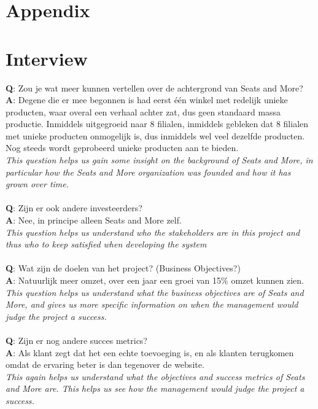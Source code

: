 \documentclass[a4paper]{article}
\begin{document}
\newpage
\section*{Appendix}
\appendix 
\section{Interview}
\textbf{Q}: Zou je wat meer kunnen vertellen over de achtergrond van Seats and More?
\textbf{A}: Degene die er mee begonnen is had eerst één winkel met redelijk unieke producten, waar overal een verhaal achter zat, dus geen standaard massa productie. Inmiddels uitgegroeid naar 8 filialen, inmiddels gebleken dat 8 filialen met unieke producten onmogelijk is, dus inmiddels wel veel dezelfde producten. Nog steeds wordt geprobeerd unieke producten aan te bieden.\\ 
\textit{This question helps us gain some insight on the background of \textit{Seats and More}, in particular how the \textit{Seats and More} organization was founded and how it has grown over time. }\\
\\
\textit{}
\textbf{Q}: Zijn er ook andere investeerders?\\
\textbf{A}: Nee, in principe alleen Seats and More zelf.\\
\textit{This question helps us understand who the stakeholders are in this project and thus who to keep satisfied when developing the system}\\
\\
\textbf{Q}: Wat zijn de doelen van het project? (Business Objectives?) \\
\textbf{A}: Natuurlijk meer omzet, over een jaar een groei van 15\% omzet kunnen zien.\\
\textit{This question helps us understand what the business objectives are of \textit{Seats and More}, and gives us more specific information on when the management would judge the project a success.}\\
\\
\textbf{Q}: Zijn er nog andere succes metrics?\\
\textbf{A}: Als klant zegt dat het een echte toevoeging is, en als klanten terugkomen omdat de ervaring beter is dan tegenover de website.\\
\textit{This again helps us understand what the objectives and success metrics of \textit{Seats and More} are. This helps us see how the management would judge the project a success.}\\
\end{document}
